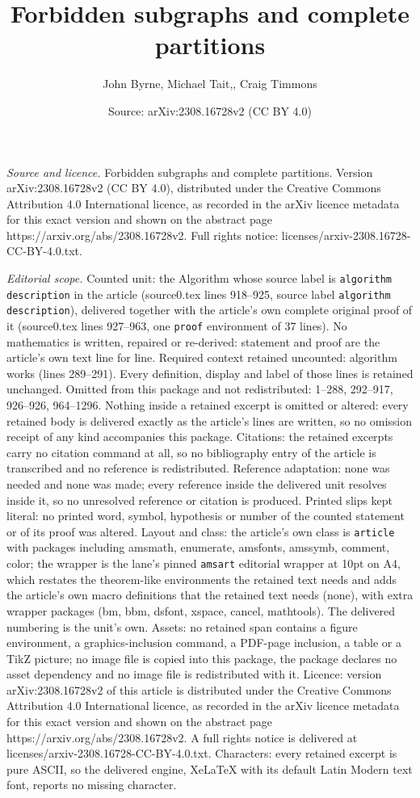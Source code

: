 \documentclass[10pt,a4paper]{amsart}
\title[Forbidden subgraphs and complete partitions]{Forbidden subgraphs and complete partitions}
\author{John Byrne, Michael Tait,, Craig Timmons}
\date{Source: arXiv:2308.16728v2 (CC BY 4.0)}
\begin{document}
\maketitle

\noindent\emph{Source and licence.} Forbidden subgraphs and complete partitions. Version arXiv:2308.16728v2 (CC BY 4.0), distributed under the Creative Commons Attribution 4.0 International licence, as recorded in the arXiv licence metadata for this exact version and shown on the abstract page https://arxiv.org/abs/2308.16728v2. Full rights notice: licenses/arxiv-2308.16728-CC-BY-4.0.txt.\par\smallskip

\noindent\textit{Editorial scope.} Counted unit: the Algorithm whose source label is \texttt{algorithm description} in the article (source0.tex lines 918--925, source label \texttt{algorithm description}), delivered together with the article's own complete original proof of it (source0.tex lines 927--963, one \texttt{proof} environment of 37 lines). No mathematics is written, repaired or re-derived: statement and proof are the article's own text line for line. Required context retained uncounted: algorithm works (lines 289--291). Every definition, display and label of those lines is retained unchanged. Omitted from this package and not redistributed: 1--288, 292--917, 926--926, 964--1296. Nothing inside a retained excerpt is omitted or altered: every retained body is delivered exactly as the article's lines are written, so no omission receipt of any kind accompanies this package. Citations: the retained excerpts carry no citation command at all, so no bibliography entry of the article is transcribed and no reference is redistributed. Reference adaptation: none was needed and none was made; every reference inside the delivered unit resolves inside it, so no unresolved reference or citation is produced. Printed slips kept literal: no printed word, symbol, hypothesis or number of the counted statement or of its proof was altered. Layout and class: the article's own class is \texttt{article} with packages including amsmath, enumerate, amsfonts, amssymb, comment, color; the wrapper is the lane's pinned \texttt{amsart} editorial wrapper at 10pt on A4, which restates the theorem-like environments the retained text needs and adds the article's own macro definitions that the retained text needs (none), with extra wrapper packages (bm, bbm, dsfont, xspace, cancel, mathtools). The delivered numbering is the unit's own. Assets: no retained span contains a figure environment, a graphics-inclusion command, a PDF-page inclusion, a table or a TikZ picture; no image file is copied into this package, the package declares no asset dependency and no image file is redistributed with it. Licence: version arXiv:2308.16728v2 of this article is distributed under the Creative Commons Attribution 4.0 International licence, as recorded in the arXiv licence metadata for this exact version and shown on the abstract page https://arxiv.org/abs/2308.16728v2. A full rights notice is delivered at licenses/arxiv-2308.16728-CC-BY-4.0.txt. Characters: every retained excerpt is pure ASCII, so the delivered engine, XeLaTeX with its default Latin Modern text font, reports no missing character.
\end{document}
